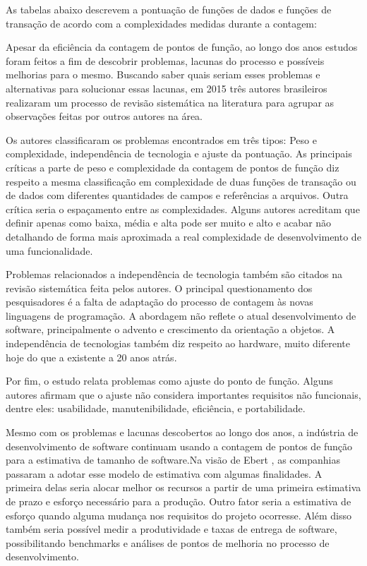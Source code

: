 As tabelas abaixo descrevem a pontuação de funções de dados e funções de transação de acordo com a complexidades medidas durante a contagem:





Apesar da eficiência da contagem de pontos de função, ao longo dos anos estudos foram feitos a fim de descobrir problemas, lacunas do processo e possíveis melhorias para o mesmo. Buscando saber quais seriam esses problemas e alternativas para solucionar essas lacunas, em 2015 três autores brasileiros realizaram um processo de revisão sistemática na literatura para agrupar as observações feitas por outros autores na área.

Os autores classificaram os problemas encontrados em três tipos: Peso e complexidade, independência de tecnologia e ajuste da pontuação. As principais críticas a parte de peso e complexidade da contagem de pontos de função diz respeito a mesma classificação em complexidade de duas funções de transação ou de dados com diferentes quantidades de campos e referências a arquivos. Outra crítica seria o espaçamento entre as complexidades. Alguns autores acreditam que definir apenas como baixa, média e alta pode ser muito e alto e acabar não detalhando de forma mais aproximada a real complexidade de desenvolvimento de uma funcionalidade.

Problemas relacionados a independência de tecnologia também são citados na revisão sistemática feita pelos autores. O principal questionamento dos pesquisadores é a falta de adaptação do processo de contagem às novas linguagens de programação. A abordagem não reflete o atual desenvolvimento de software, principalmente o advento e crescimento da orientação a objetos. A independência de tecnologias também diz respeito ao hardware, muito diferente hoje do que a existente a 20 anos atrás.

Por fim, o estudo relata problemas como ajuste do ponto de função. Alguns autores afirmam que o ajuste não considera  importantes requisitos não funcionais, dentre eles: usabilidade, manutenibilidade, eficiência, e portabilidade.

Mesmo com os problemas e lacunas descobertos ao longo dos anos, a indústria de desenvolvimento de software continuam usando a contagem de pontos de função para a estimativa de tamanho de software.Na visão de Ebert \cite{Ebert:2014}, as companhias passaram a adotar esse modelo de estimativa com algumas finalidades. A primeira delas seria alocar melhor os recursos a partir de uma primeira estimativa de prazo e esforço necessário para a produção. Outro fator seria a estimativa de esforço quando alguma mudança nos requisitos do projeto ocorresse. Além disso também seria possível medir a produtividade e taxas de entrega de software, possibilitando benchmarks  e análises de pontos de melhoria no processo de desenvolvimento.

